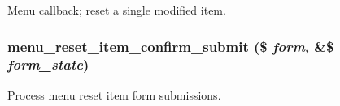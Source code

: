 Menu callback; reset a single modified item. \hypertarget{menu_8admin_8inc_84c625e0f863a78cf6c68f16e136422f}{
\subsubsection[{menu\_\-reset\_\-item\_\-confirm\_\-submit}]{\setlength{\rightskip}{0pt plus 5cm}menu\_\-reset\_\-item\_\-confirm\_\-submit (\$ {\em form}, \/  \&\$ {\em form\_\-state})}}
\label{menu_8admin_8inc_84c625e0f863a78cf6c68f16e136422f}


Process menu reset item form submissions. 